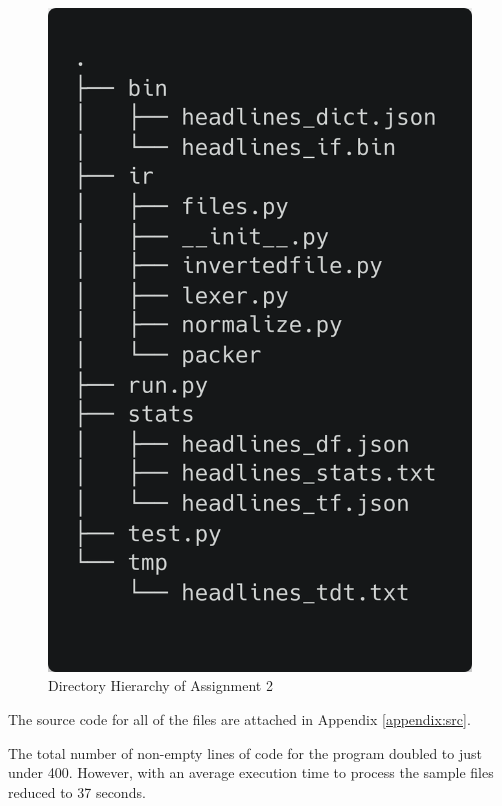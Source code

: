 \documentclass[11pt]{article}
\begin{document}
\begin{figure}[!ht]
    \caption{Directory Hierarchy of Assignment 2}
    \centering
    \includegraphics[scale=0.2]{statics/dirtree.png}
\end{figure}

The source code for all of the files are attached in Appendix \ref{appendix:src}.

The total number of non-empty lines of code for the program doubled to just under 400. However, with an average execution time to process the sample files reduced to 37 seconds. 

\end{document}
